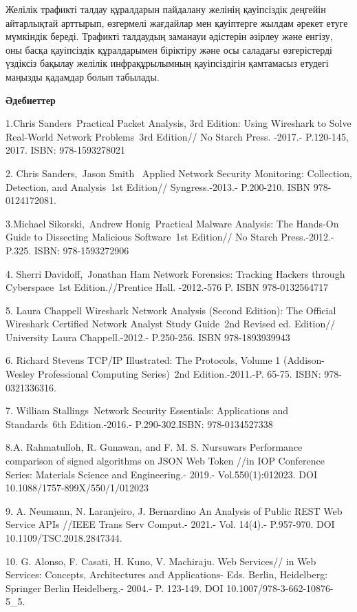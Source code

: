 Желілік трафикті талдау құралдарын пайдалану желінің қауіпсіздік
деңгейін айтарлықтай арттырып, өзгермелі жағдайлар мен қауіптерге жылдам
әрекет етуге мүмкіндік береді. Трафикті талдаудың заманауи әдістерін
әзірлеу және енгізу, оны басқа қауіпсіздік құралдарымен біріктіру және
осы саладағы өзгерістерді үздіксіз бақылау желілік инфрақұрылымның
қауіпсіздігін қамтамасыз етудегі маңызды қадамдар болып табылады.

{\bfseries Әдебиеттер}

1.Chris Sanders~Practical Packet Analysis, 3rd Edition: Using Wireshark
to Solve Real-World Network Problems~3rd Edition// No Starch Press.
-2017.- P.120-145, 2017. ISBN: 978-1593278021

2. Chris Sanders,~Jason Smith~ Applied Network Security Monitoring:
Collection, Detection, and Analysis~1st Edition// Syngress.-2013.-
P.200-210. ISBN 978-0124172081.

3.Michael Sikorski,~Andrew Honig~Practical Malware Analysis: The
Hands-On Guide to Dissecting Malicious Software~1st Edition// No Starch
Press.-2012.-P.325. ISBN: 978-1593272906

4. Sherri Davidoff,~Jonathan Ham Network Forensics: Tracking Hackers
through Cyberspace~1st Edition.//Prentice Hall. -2012.-576 P. ISBN
978-0132564717

5. Laura Chappell Wireshark Network Analysis (Second Edition): The
Official Wireshark Certified Network Analyst Study Guide~2nd Revised ed.
Edition// University Laura Chappell.-2012.- P.250-256. ISBN
978-1893939943

6. Richard Stevens TCP/IP Illustrated: The Protocols, Volume 1
(Addison-Wesley Professional Computing Series)~2nd Edition.-2011.-P.
65-75. ISBN: 978-0321336316.

7. William Stallings~Network Security Essentials: Applications and
Standards~6th Edition.-2016.- P.290-302.ISBN: 978-0134527338

8.A. Rahmatulloh, R. Gunawan, and F. M. S. Nursuwars Performance
comparison of signed algorithms on JSON Web Token //in IOP Conference
Series: Materials Science and Engineering.- 2019.- Vol.550(1):012023.
DOI 10.1088/1757-899X/550/1/012023

9. A. Neumann, N. Laranjeiro, J. Bernardino An Analysis of Public REST
Web Service APIs //IEEE Trans Serv Comput.- 2021.- Vol. 14(4).-
P.957-970. DOI 10.1109/TSC.2018.2847344.

10. G. Alonso, F. Casati, H. Kuno, V. Machiraju. Web Services// in Web
Services: Concepts, Architectures and Applications- Eds. Berlin,
Heidelberg: Springer Berlin Heidelberg.- 2004.- P. 123-149. DOI
10.1007/978-3-662-10876-5\_5.

